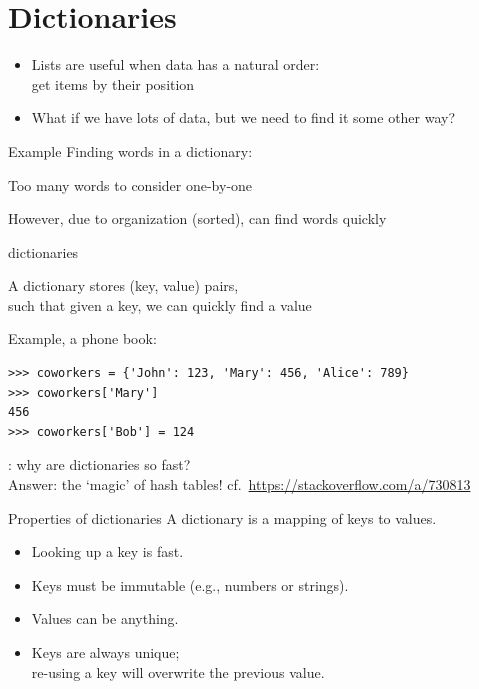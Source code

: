 \documentclass[aspectratio=169,usenames,dvipsnames]{beamer}
\begin{document}
\section{Dictionaries}
\frame{\tableofcontents[currentsection]}

\begin{frame}
    \begin{itemize}
        \item Lists are useful when data has a natural order: \\
            get items by their position
        \pause
        \item What if we have lots of data,
            but we need to find it some other way?
    \end{itemize}

    \begin{block}{Example}
    Finding words in a dictionary:

    Too many words to consider one-by-one

    However, due to organization (sorted), can find words quickly
    \end{block}
\end{frame}


\begin{frame}[fragile]{dictionaries}
    \begin{definition}
        A dictionary stores (key, value) pairs, \\
        such that given a key, we can quickly find a value
    \end{definition}
Example, a phone book:
\begin{lstlisting}
>>> coworkers = {'John': 123, 'Mary': 456, 'Alice': 789}
>>> coworkers['Mary']
456
>>> coworkers['Bob'] = 124
\end{lstlisting}

\vspace{1em}
: why are dictionaries so fast?\\
Answer: the `magic' of hash tables!
    cf.~\url{https://stackoverflow.com/a/730813}
\end{frame}

\begin{frame}{Properties of dictionaries}
A dictionary is a mapping of keys to values.

    \begin{itemize}
        \item Looking up a key is fast.
        \item Keys must be immutable (e.g., numbers or strings).
        \item Values can be anything.
        \item Keys are always unique; \\
            re-using a key will overwrite the previous value.
    \end{itemize}
\end{frame}
\end{document}
